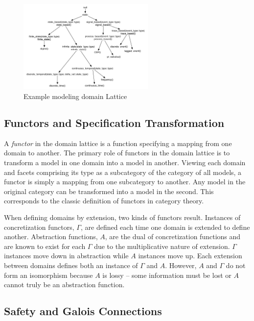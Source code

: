 \documentclass[12pt]{article}
\begin{document}
\begin{figure}[hbtp]
  \centering
  \includegraphics[width=0.6\textwidth]{figures/semi-lattice-detailed.pdf}
  \caption{Example modeling domain Lattice}
  \label{fig:semi-lattice-detailed}
\end{figure}

\subsection{Functors and Specification Transformation}

A \emph{functor} in the domain lattice is a function specifying a
mapping from one domain to another.  The primary role of functors in
the domain lattice is to transform a model in one domain into a model
in another.  Viewing each domain and facets comprising its type as a
subcategory of the category of all models, a functor is simply a
mapping from one subcategory to another.  Any model in the original
category can be transformed into a model in the second.  This
corresponds to the classic definition of functors in category theory.

When defining domains by extension, two kinds of functors result.
Instances of concretization functors, $\Gamma$, are defined each time
one domain is extended to define another.  Abstraction functions, $A$,
are the dual of concretization functions and are known to exist for
each $\Gamma$ due to the multiplicative nature of extension.  $\Gamma$
instances move down in abstraction while $A$ instances move up.  Each
extension between domains defines both an instance of $\Gamma$ and
$A$.  However, $A$ and $\Gamma$ do not form an isomorphism because $A$
is lossy -- some information must be lost or $A$ cannot truly be an
abstraction function.

\subsection{Safety and Galois Connections}
\end{document}
